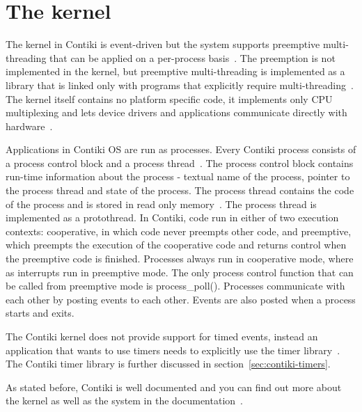 
\section{The kernel}
The kernel in Contiki is event-driven but the system supports preemptive
multi-threading that can be applied on a per-process basis~\cite{video}.
The preemption is not implemented in the kernel, but
preemptive multi-threading is implemented as a library that is linked only with programs that
explicitly require multi-threading~\cite{paper-contiki}.
The kernel itself contains no platform specific code, it implements only CPU multiplexing and
lets device drivers and applications communicate directly with hardware~\cite{video}.

Applications in Contiki OS are run as processes.
Every Contiki process consists of a process control block and a process thread~\cite{contiki-wiki-processes}.
The process control block contains run-time information about the process -
textual name of the process, pointer to the process thread and state of the process.
The process thread contains the code of the process and is stored in read only memory~\cite{contiki-wiki-processes}.
The process thread is implemented as a protothread.
In Contiki, code run in either of two execution contexts:
cooperative, in which code never preempts other code, and preemptive,
which preempts the execution of the cooperative code and returns control
when the preemptive code is finished.
Processes always run in cooperative mode, where as interrupts run in preemptive mode.
The only process control function that can be called from preemptive mode is process\_poll(). 
Processes communicate with each other by posting events to each other.
Events are also posted when a process starts and exits.

The Contiki kernel does not provide support for timed events,
instead an application that wants to use timers needs to explicitly use the timer library~\cite{contiki-docs}.
The Contiki timer library is further discussed in section~\ref{sec:contiki-timers}.

As stated before, Contiki is well documented and you can find out more about
the kernel as well as the system in the documentation~\cite{contiki-docs}.
